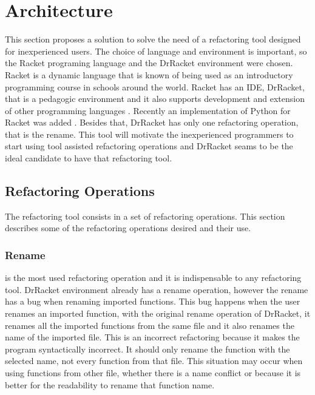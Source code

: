 
% 
% 

\section{Architecture}

This section proposes a solution to solve the need of a refactoring tool designed for inexperienced users.
The choice of language and environment is important, so the Racket programing language and the DrRacket environment were chosen.
Racket is a dynamic language that is known of being used as an introductory programming course in schools around the world. 
Racket has an IDE, DrRacket, that is a pedagogic environment \cite{drscheme_pegadogy} and it also supports development and extension of other programming languages \cite{tobin2011languages}. 
Recently  an implementation of Python for Racket was added \cite{ramos2014implementation}.
Besides that, DrRacket has only one refactoring operation, that is the rename.
This tool will motivate the inexperienced programmers to start using tool assisted refactoring operations and DrRacket seams to be the ideal candidate to have that refactoring tool.


\subsection{Refactoring Operations}
The refactoring tool consists in a set of refactoring operations.
This section describes some of the refactoring operations desired and their use.

\subsubsection{Rename}
\label{ssub:Rename}
is the most used refactoring operation and it is indispensable to any refactoring tool.
DrRacket environment already has a rename operation, however the rename has a bug when renaming imported functions.
This bug happens when the user renames an imported function, with the original rename operation of DrRacket, it renames all the imported functions from the same file and it also renames the name of the imported file.
This is an incorrect refactoring because it makes the program syntactically incorrect. It should only rename the function with the selected name, not every function from that file.
This situation may occur when using functions from other file, whether there is a name conflict or because it is better for the readability to rename that function name.


